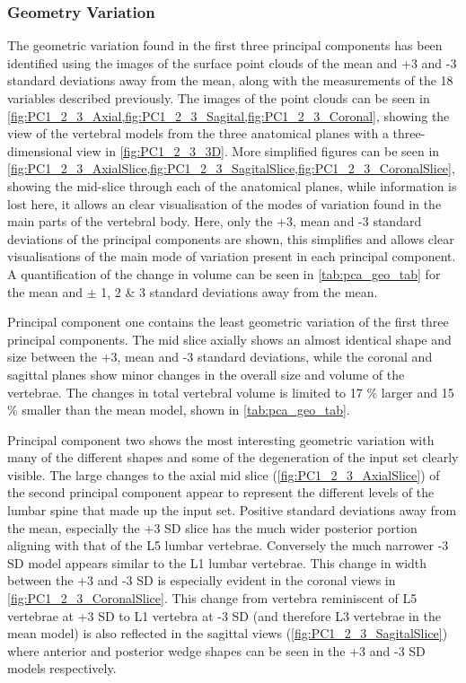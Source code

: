 \subsubsection{Geometry Variation}

The geometric variation found in the first three principal components has been
identified using the images of the surface point clouds of the mean and +3 and
-3 standard deviations away from the mean, along with the measurements of the
18 variables described previously.  The images of the point clouds can be seen
in \cref{fig:PC1_2_3_Axial,fig:PC1_2_3_Sagital,fig:PC1_2_3_Coronal}, showing
the view of the vertebral models from the three anatomical planes with a
three-dimensional view in \cref{fig:PC1_2_3_3D}.  More simplified figures can
be seen in
\cref{fig:PC1_2_3_AxialSlice,fig:PC1_2_3_SagitalSlice,fig:PC1_2_3_CoronalSlice},
showing the mid-slice through each of the anatomical planes, while information
is lost here, it allows an clear visualisation of the modes of variation found
in the main parts of the vertebral body.  Here, only the +3, mean and -3
standard deviations of the principal components are shown, this simplifies and
allows clear visualisations of the main mode of variation present in each
principal component.  A quantification of the change in volume can be seen in
\cref{tab:pca_geo_tab} for the mean and $\pm$ 1, 2 \& 3 standard deviations
away from the mean.

Principal component one contains the least geometric variation of the first
three principal components.  The mid slice axially shows an almost identical
shape and size between the +3, mean and -3 standard deviations, while the
coronal and sagittal planes show minor changes in the overall size and volume
of the vertebrae.  The changes in total vertebral volume is limited to 17 \%
larger and 15 \% smaller than the mean model, shown in \cref{tab:pca_geo_tab}.

Principal component two shows the most interesting geometric variation with
many of the different shapes and some of the degeneration of the input set
clearly visible.  The large changes to the axial mid slice
(\cref{fig:PC1_2_3_AxialSlice}) of the second principal component appear to
represent the different levels of the lumbar spine that made up the input set.
Positive standard deviations away from the mean, especially the +3 SD slice has
the much wider posterior portion aligning with that of the L5 lumbar vertebrae.
Conversely the much narrower -3 SD model appears similar to the L1 lumbar
vertebrae.  This change in width between the +3 and -3 SD is especially evident
in the coronal views in \cref{fig:PC1_2_3_CoronalSlice}.  This change from
vertebra reminiscent of L5 vertebrae at +3 SD to L1 vertebra at -3 SD (and
therefore L3 vertebrae in the mean model) is also reflected in the sagittal
views (\cref{fig:PC1_2_3_SagitalSlice}) where anterior and posterior wedge
shapes can be seen in the +3 and -3 SD models respectively.

